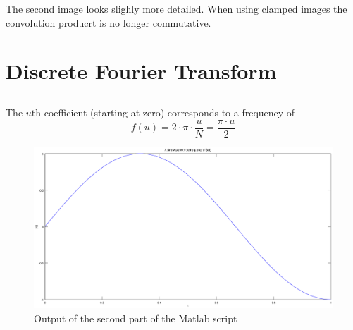 \documentclass[DIN, pagenumber=false, fontsize=11pt, parskip=half]{scrartcl}
\begin{document}
    The second image looks slighly more detailed. When using clamped images the convolution producrt is no longer commutative.


    \section{Discrete Fourier Transform}
    \subsection{}
                  
    \subsection{}
    The $u$th coefficient (starting at zero) corresponds to a frequency of
    \begin{equation*}
        f(u) = 2 \cdot \pi \cdot \frac{u}{N} = \frac{\pi \cdot u}{2}
    \end{equation*}
                  
    \begin{figure}[H]
        \centering
        \includegraphics[clip,width=\textwidth]{frequency.eps}
        \caption{Output of the second part of the Matlab script}
    \end{figure}
    \subsection{}
                  
\end{document}
